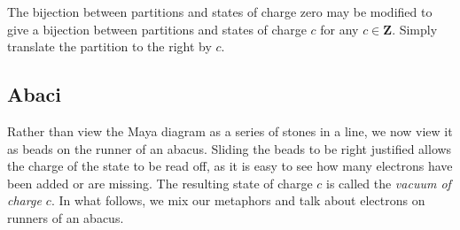 \documentclass{amsart}[12pt]
\theoremstyle{definition}
\newcommand{\Z}{\mathbf{Z}}
\begin{document}
The bijection between partitions and states of charge zero may be
modified to give a bijection between partitions and states of charge $c$ for any $c\in\Z$.   Simply translate the partition to the right by $c$.



\subsection{Abaci}

Rather than view the Maya diagram as a series of stones in a line, we
now view it as beads on the runner of an abacus.  Sliding the beads
to be right justified allows the charge of the state to be read off,
as it is easy to see how many electrons have been added or are missing.  The resulting state of charge $c$ is called the \emph{vacuum of charge $c$}.  In what follows, we mix our metaphors and talk about electrons on runners of an abacus.
\end{document}
